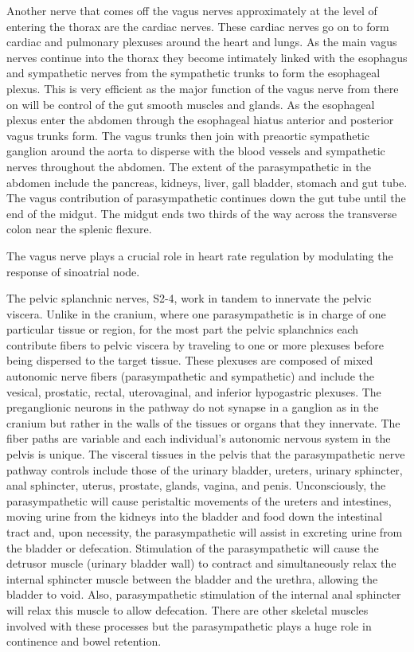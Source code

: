 Another nerve that comes off the vagus nerves approximately at the level of entering the thorax are the cardiac nerves. These cardiac nerves go on to form cardiac and pulmonary plexuses around the heart and lungs. As the main vagus nerves continue into the thorax they become intimately linked with the esophagus and sympathetic nerves from the sympathetic trunks to form the esophageal plexus. This is very efficient as the major function of the vagus nerve from there on will be control of the gut smooth muscles and glands. As the esophageal plexus enter the abdomen through the esophageal hiatus anterior and posterior vagus trunks form. The vagus trunks then join with preaortic sympathetic ganglion around the aorta to disperse with the blood vessels and sympathetic nerves throughout the abdomen. The extent of the parasympathetic in the abdomen include the pancreas, kidneys, liver, gall bladder, stomach and gut tube. The vagus contribution of parasympathetic continues down the gut tube until the end of the midgut. The midgut ends two thirds of the way across the transverse colon near the splenic flexure.

The vagus nerve plays a crucial role in heart rate regulation by modulating the response of sinoatrial node.

The pelvic splanchnic nerves, S2-4, work in tandem to innervate the pelvic viscera. Unlike in the cranium, where one parasympathetic is in charge of one particular tissue or region, for the most part the pelvic splanchnics each contribute fibers to pelvic viscera by traveling to one or more plexuses before being dispersed to the target tissue. These plexuses are composed of mixed autonomic nerve fibers (parasympathetic and sympathetic) and include the vesical, prostatic, rectal, uterovaginal, and inferior hypogastric plexuses. The preganglionic neurons in the pathway do not synapse in a ganglion as in the cranium but rather in the walls of the tissues or organs that they innervate. The fiber paths are variable and each individual's autonomic nervous system in the pelvis is unique. The visceral tissues in the pelvis that the parasympathetic nerve pathway controls include those of the urinary bladder, ureters, urinary sphincter, anal sphincter, uterus, prostate, glands, vagina, and penis. Unconsciously, the parasympathetic will cause peristaltic movements of the ureters and intestines, moving urine from the kidneys into the bladder and food down the intestinal tract and, upon necessity, the parasympathetic will assist in excreting urine from the bladder or defecation. Stimulation of the parasympathetic will cause the detrusor muscle (urinary bladder wall) to contract and simultaneously relax the internal sphincter muscle between the bladder and the urethra, allowing the bladder to void. Also, parasympathetic stimulation of the internal anal sphincter will relax this muscle to allow defecation. There are other skeletal muscles involved with these processes but the parasympathetic plays a huge role in continence and bowel retention.

